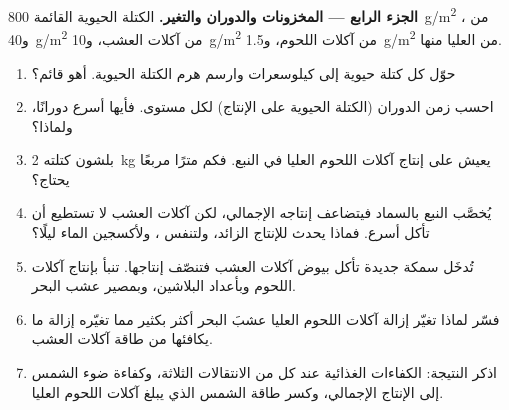\begin{problem}
\medskip
\noindent\textbf{الجزء الرابع --- المخزونات والدوران والتغير.}
الكتلة الحيوية القائمة \qty{800}{g/m^2} من ، و\qty{40}{g/m^2}
من آكلات العشب، و\qty{10}{g/m^2} من آكلات اللحوم، و\qty{1.5}{g/m^2} من
العليا منها.
\begin{enumerate}[resume]
  \item حوّل كل كتلة حيوية إلى كيلوسعرات وارسم هرم
        الكتلة الحيوية. أهو قائم؟
  \item احسب زمن الدوران (الكتلة الحيوية على الإنتاج) لكل مستوى.
        فأيها أسرع دورانًا، ولماذا؟
  \item بلشون كتلته \qty{2}{kg} يعيش على إنتاج آكلات اللحوم العليا
        في النبع. فكم مترًا مربعًا يحتاج؟
  \item يُخصَّب النبع بالسماد فيتضاعف إنتاجه الإجمالي، لكن آكلات
        العشب لا تستطيع أن تأكل أسرع.
        فماذا يحدث للإنتاج الزائد، ولتنفس ،
        ولأكسجين الماء ليلًا؟
  \item تُدخَل سمكة جديدة تأكل بيوض آكلات العشب
        فتنصّف إنتاجها. تنبأ بإنتاج آكلات اللحوم
        وبأعداد البلاشين، وبمصير عشب البحر.
  \item فسّر لماذا تغيّر إزالة آكلات اللحوم العليا عشبَ البحر
        أكثر بكثير مما تغيّره إزالة ما يكافئها من طاقة آكلات
        العشب.
  \item اذكر النتيجة: الكفاءات الغذائية عند كل من الانتقالات
        الثلاثة، وكفاءة ضوء الشمس إلى الإنتاج الإجمالي، وكسر طاقة
        الشمس الذي يبلغ آكلات اللحوم العليا.
\end{enumerate}
\end{problem}
